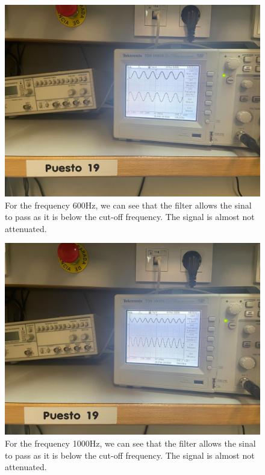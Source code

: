 \documentclass[a4paper, 12pt]{article}
\begin{document}
\begin{figure}[htbp]
\centering
\includegraphics[width=.9\linewidth]{./img/oscilloscope_f_600.jpg}
\caption{For the frequency 600Hz, we can see that the filter allows the sinal to pass as it is below the cut-off frequency. The signal is almost not attenuated.}
\end{figure}

\begin{figure}[htbp]
\centering
\includegraphics[width=.9\linewidth]{./img/oscilloscope_f_1000.jpg}
\caption{For the frequency 1000Hz, we can see that the filter allows the sinal to pass as it is below the cut-off frequency. The signal is almost not attenuated.}
\end{figure}
\end{document}
